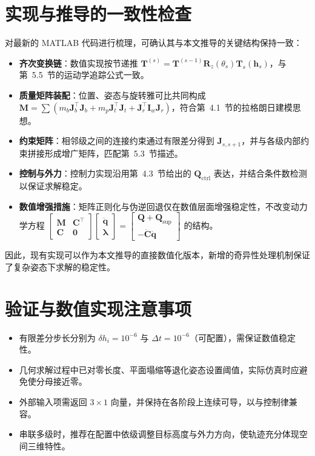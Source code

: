 \documentclass[12pt,a4paper]{article}
\begin{document}
\section{实现与推导的一致性检查}
对最新的 MATLAB 代码进行梳理，可确认其与本文推导的关键结构保持一致：
\begin{itemize}
  \item \textbf{齐次变换链}：数值实现按节递推 $\bm T^{(s)} = \bm T^{(s-1)} \bm R_z(\theta_s) \bm T_s(\bm h_s)$，与第~5.5~节的运动学追踪公式一致。
  \item \textbf{质量矩阵装配}：位置、姿态与旋转雅可比共同构成 $\bm M = \sum (m_b \bm J_b^\top \bm J_b + m_p \bm J_t^\top \bm J_t + \bm J_r^\top \bm I_w \bm J_r)$，符合第~4.1~节的拉格朗日建模思想。
  \item \textbf{约束矩阵}：相邻级之间的连接约束通过有限差分得到 $\bm J_{s,s+1}$，并与各级内部约束拼接形成增广矩阵，匹配第~5.3~节描述。
  \item \textbf{控制与外力}：控制力实现沿用第~4.3~节给出的 $\bm Q_{\text{ctrl}}$ 表达，并结合条件数检测以保证求解稳定。
  \item \textbf{数值增强措施}：矩阵正则化与伪逆回退仅在数值层面增强稳定性，不改变动力学方程 $\begin{bmatrix}\bm M & \bm C^\top\\ \bm C & \bm 0\end{bmatrix}\begin{bmatrix}\ddot{\bm q}\\ \bm \lambda\end{bmatrix} = \begin{bmatrix}\bm Q + \bm Q_{\text{sup}}\\ -\dot{\bm C}\dot{\bm q}\end{bmatrix}$ 的结构。
\end{itemize}
因此，现有实现可以作为本文推导的直接数值化版本，新增的奇异性处理机制保证了复杂姿态下求解的稳定性。

\section{验证与数值实现注意事项}
\begin{itemize}
  \item 有限差分步长分别为 $\delta h_i = 10^{-6}$ 与 $\Delta t = 10^{-6}$（可配置），需保证数值稳定性。
  \item 几何求解过程中已对零长度、平面塌缩等退化姿态设置阈值，实际仿真时应避免使分母接近零。
  \item 外部输入项需返回 $3\times 1$ 向量，并保持在各阶段上连续可导，以与控制律兼容。
  \item 串联多级时，推荐在配置中依级调整目标高度与外力方向，使轨迹充分体现空间三维特性。
\end{itemize}
\end{document}
